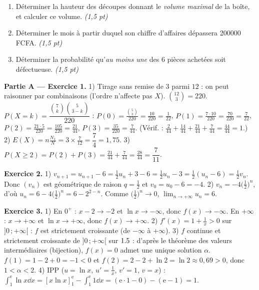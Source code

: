 \begin{enumerate}[label=\textbf{Tâche \arabic*.},leftmargin=2.4em]
\item Déterminer la hauteur des découpes donnant le \emph{volume maximal} de la boîte, et
calculer ce volume. \hfill\textit{(1,5 pt)}
\item Déterminer le mois à partir duquel son chiffre d'affaires dépassera \SI{200000}{} FCFA. \hfill\textit{(1,5 pt)}
\item Déterminer la probabilité qu'\emph{au moins une} des $6$ pièces achetées soit défectueuse. \hfill\textit{(1,5 pt)}
\end{enumerate}
\par{}


\noindent\textbf{Partie A — Exercice 1.}
1) Tirage sans remise de $3$ parmi $12$ : on peut raisonner par combinaisons (l'ordre
n'affecte pas $X$). $\binom{12}{3}=220$. $P(X{=}k)=\dfrac{\binom7k\binom5{3-k}}{220}$ :
$P(0)=\frac{\binom53}{220}=\frac{10}{220}=\frac{1}{22}$,
$P(1)=\frac{7\cdot10}{220}=\frac{70}{220}=\frac{7}{22}$,
$P(2)=\frac{21\cdot5}{220}=\frac{105}{220}=\frac{21}{44}$,
$P(3)=\frac{35}{220}=\frac{7}{44}$.
(Vérif. : $\frac{2}{44}+\frac{14}{44}+\frac{21}{44}+\frac{7}{44}=\frac{44}{44}=1$.)
2) $E(X)=n\frac{N_1}{N}=3\times\frac{7}{12}=\dfrac{7}{4}=1{,}75$.
3) $P(X\ge2)=P(2)+P(3)=\frac{21}{44}+\frac{7}{44}=\frac{28}{44}=\dfrac{7}{11}$.

\noindent\textbf{Exercice 2.}
1) $v_{n+1}=u_{n+1}-6=\frac12 u_n+3-6=\frac12 u_n-3=\frac12(u_n-6)=\frac12 v_n$.
Donc $(v_n)$ est géométrique de raison $q=\frac12$ et $v_0=u_0-6=-4$.
2) $v_n=-4\big(\tfrac12\big)^n$, d'où $u_n=6-4\big(\tfrac12\big)^n=6-2^{2-n}$.
Comme $\big(\tfrac12\big)^n\to0$, $\displaystyle\lim_{n\to+\infty}u_n=6$.

\noindent\textbf{Exercice 3.}
1) En $0^+$ : $x-2\to-2$ et $\ln x\to-\infty$, donc $f(x)\to-\infty$. En $+\infty$ : $x\to+\infty$ et
$\ln x\to+\infty$, donc $f(x)\to+\infty$.
2) $f'(x)=1+\frac1x>0$ sur $]0\,;+\infty[$ : $f$ est strictement croissante (de $-\infty$ à $+\infty$).
3) $f$ continue et strictement croissante de $]0\,;+\infty[$ sur $1.5$ : d'après le théorème des
valeurs intermédiaires (bijection), $f(x)=0$ admet une unique solution $\alpha$.
$f(1)=1-2+0=-1<0$ et $f(2)=2-2+\ln2=\ln2\approx0{,}69>0$, donc $1<\alpha<2$.
4) IPP ($u=\ln x$, $u'=\frac1x$, $v'=1$, $v=x$) :
$\int_1^{\mathrm e}\ln x\dd x=[x\ln x]_1^{\mathrm e}-\int_1^{\mathrm e}1\dd x=(\mathrm e\cdot1-0)-(\mathrm e-1)=1$.

